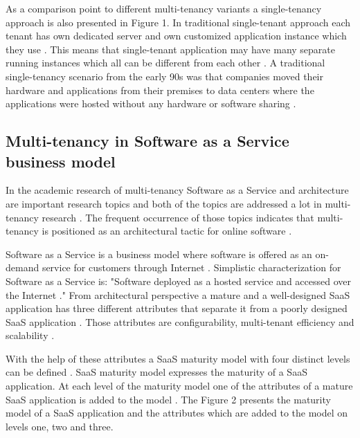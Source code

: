 \documentclass[conference]{sasmoota2017}
\begin{document}
As a comparison point to different multi-tenancy variants a single-tenancy approach is also presented in Figure 1. In traditional single-tenant approach each tenant has own dedicated server and own customized application instance which they use \cite{Bezemer:2010:MaintenanceDream}. This means that single-tenant application may have many separate running instances which all can be different from each other \cite{Bezemer:2010:MaintenanceDream}. A traditional single-tenancy scenario from the early 90s was that companies moved their hardware and applications from their premises to data centers where the applications were hosted without any hardware or software sharing \cite{Guo:2007:FrameworkForNative}. 

\subsection{Multi-tenancy in Software as a Service business model}

In the academic research of multi-tenancy Software as a Service and architecture are important research topics and both of the topics are addressed a lot in multi-tenancy research \cite{Kabbedijk2015:Defining}. The frequent occurrence of those topics indicates that multi-tenancy is positioned as an architectural tactic for online software \cite{Kabbedijk2015:Defining}. 

Software as a Service is a business model where software is offered as an on-demand service for customers through Internet \cite{Bezemer:2010:MaintenanceDream}. Simplistic characterization for Software as a Service is: "Software deployed as a hosted service and accessed over the Internet \cite{Carraro:2006:ArchitectureLongTail}." From architectural perspective a mature and a well-designed SaaS application has three different attributes that separate it from a poorly designed SaaS application \cite{Carraro:2006:ArchitectureLongTail}. Those attributes are configurability, multi-tenant efficiency and scalability \cite{Carraro:2006:ArchitectureLongTail}.

With the help of these attributes a SaaS maturity model with four distinct levels can be defined \cite{Carraro:2006:ArchitectureLongTail}. SaaS maturity model expresses the maturity of a SaaS application. At each level of the maturity model one of the attributes of a mature SaaS application is added to the model \cite{Carraro:2006:ArchitectureLongTail}. The Figure 2 presents the maturity model of a SaaS application and the attributes which are added to the model on levels one, two and three. 
\end{document}
